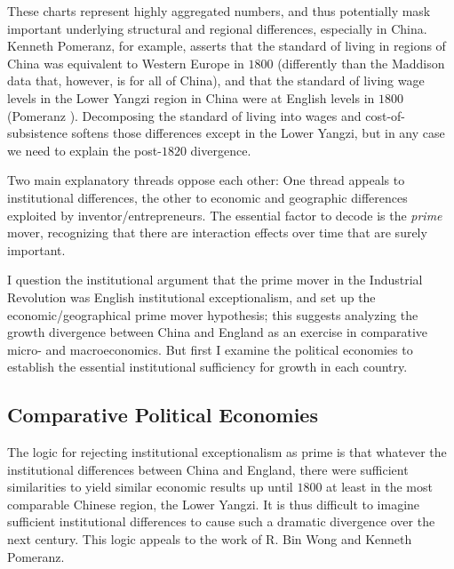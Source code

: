 \documentclass[12pt]{article}
\numberwithin{equation}{section}
\begin{document}

		
		These charts represent highly aggregated numbers, and thus potentially mask important underlying structural and regional differences, especially in China. Kenneth Pomeranz, for example, asserts that the standard of living in regions of China was equivalent to Western Europe in $1800$ (differently than the Maddison data that, however, is for all of China), and that the standard of living wage levels in the Lower Yangzi region in China were at English levels in $1800$ (Pomeranz \citeyear[p.~107]{pomeranz_great_2001}). Decomposing the standard of living into wages and cost-of-subsistence softens those differences except in the Lower Yangzi, but in any case we need to explain the post-$1820$ divergence.
		
		Two main explanatory threads oppose each other: One thread appeals to institutional differences, the other to economic and geographic differences exploited by inventor/entrepreneurs. The essential factor to decode is the \textit{prime} mover, recognizing that there are interaction effects over time that are surely important.
		
		I question the institutional argument that the prime mover in the Industrial Revolution was English institutional exceptionalism, and set up the economic/geographical prime mover hypothesis; this suggests analyzing the growth divergence between China and England as an exercise in comparative micro- and macroeconomics. But first I examine the political economies to establish the essential institutional sufficiency for growth in each country.
		\newpage

		\subsection*{Comparative Political Economies }
		
		The logic for rejecting institutional exceptionalism as prime is that whatever the institutional differences between China and England, there were sufficient similarities to yield similar economic results up until $1800$ at least in the most comparable Chinese region, the Lower Yangzi. It is thus difficult to imagine sufficient institutional differences to cause such a dramatic divergence over the next century. This logic appeals to the work of R. Bin Wong and Kenneth Pomeranz.
		
\end{document}
